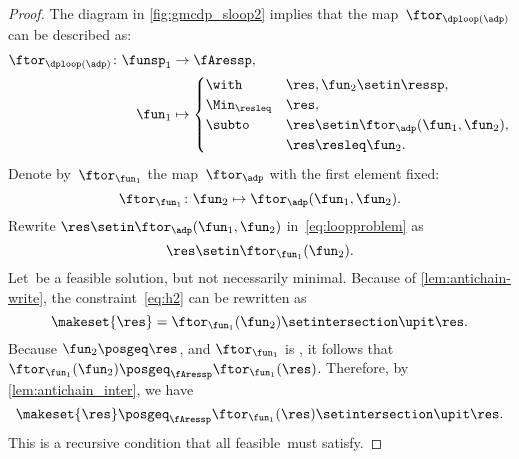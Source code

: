 \begin{proof}
    The diagram in \cref{fig:gmcdp_sloop2} implies that the map~$\ftor_{\dploop(\adp)}$
    can be described as:
    \begin{align}
        \ftor_{\dploop(\adp)}\colon\funsp_{1} & \to\fAressp,\label{eq:loopproblem} \\
        \fun_{1}                              & \mapsto\begin{cases}
                                                           \with          & \res,\fun_{2}\setin\ressp,                 \\
                                                           \Min_{\resleq} & \res,                                      \\
                                                           \subto         & \res\setin\ftor_{\adp}(\fun_{1},\fun_{2}), \\
                                                                          & \res\resleq\fun_{2}.
                                                       \end{cases}
    \end{align}
    Denote by~$\ftor_{\fun_{1}}$ the map~$\ftor_{\adp}$ with the first element fixed:
    \begin{equation*}
        \ftor_{\fun_{1}}\colon\fun_{2}\mapsto\ftor_{\adp}(\fun_{1},\fun_{2}).
    \end{equation*}
    Rewrite $\res\setin\ftor_{\adp}(\fun_{1},\fun_{2})$ in~\cref{eq:loopproblem} as
    \begin{equation}
        \res\setin\ftor_{\fun_{1}}(\fun_{2}).
        \label{eq:h2}
    \end{equation}
    Let~\res be a feasible solution, but not necessarily minimal.
    Because of \cref{lem:antichain-write}, the constraint~\cref{eq:h2} can be rewritten as
    \begin{equation}
        \makeset{\res}=\ftor_{\fun_{1}}(\fun_{2})\setintersection\upit\res.
        \label{eq:h3}
    \end{equation}
    Because $\fun_{2}\posgeq\res$, and $\ftor_{\fun_{1}}$ is \scottcontinuous, it follows that~$\ftor_{\fun_{1}}(\fun_{2})\posgeq_{\fAressp}\ftor_{\fun_{1}}(\res)$.
    Therefore, by \cref{lem:antichain_inter}, we have
    \begin{equation}
        \makeset{\res}\posgeq_{\fAressp}\ftor_{\fun_{1}}(\res)\setintersection\upit\res.
        \label{eq:fea}
    \end{equation}
    This is a recursive condition that all feasible~\res must satisfy.


\end{proof}
